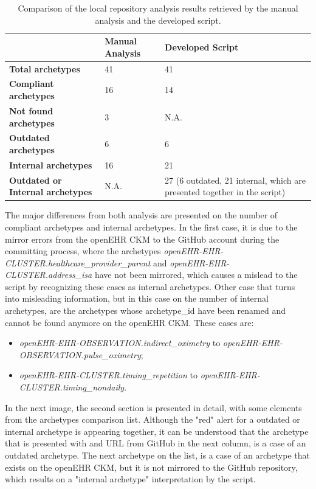 \documentclass[mim_thesis.tex]{subfiles}
\begin{document}
\begin{table}[H]
\centering
\caption{Comparison of the local repository analysis results retrieved by the manual analysis and the developed script. }
\label{tab:comp_manual_script}
\begin{tabular}{p{6cm} p{3cm} p{6.5cm}}
\toprule[2pt]
\textbf{ } & \textbf{Manual Analysis} & \textbf{Developed Script} \\ \midrule[2pt]
\textbf{Total archetypes}  & 41 & 41 \\ \midrule
\textbf{Compliant archetypes} & 16 & 14 \\ \midrule
\textbf{Not found archetypes} & 3 & N.A. \\ \midrule
\textbf{Outdated archetypes} & 6 & 6 \\ \midrule
\textbf{Internal archetypes} & 16 & 21 \\ \midrule
\textbf{Outdated or Internal archetypes} & N.A. & 27 (6 outdated, 21 internal, which are presented together in the script)
\\ \bottomrule[2pt]
\end{tabular}
\end{table}

The major differences from both analysis are presented on the number of compliant archetypes and internal archetypes. In the first case, it is due to the mirror errors from the openEHR CKM to the GitHub account during the committing process, where the archetypes \textit{openEHR-EHR-CLUSTER.healthcare\_provider\_parent} and \textit{openEHR-EHR-CLUSTER.address\_isa} have not been mirrored, which causes a mislead to the script by recognizing these cases as internal archetypes. Other case that turns into misleading information, but in this case on the number of internal archetypes, are the archetypes whose archetype\_id have been renamed and cannot be found anymore on the openEHR CKM. These cases are:

\begin{itemize}
\item \textit{openEHR-EHR-OBSERVATION.indirect\_oximetry} to \textit{openEHR-EHR-OBSERVATION.pulse\_oximetry};
\item \textit{openEHR-EHR-CLUSTER.timing\_repetition} to \textit{openEHR-EHR-CLUSTER.timing\_nondaily}.
\end{itemize}

In the next image, the second section is presented in detail, with some elements from the archetypes comparison list. Although the "red" alert for a outdated or internal archetype is appearing together, it can be understood that the archetype that is presented with and URL from GitHub in the next column, is a case of an outdated archetype. The next archetype on the list, is a case of an archetype that exists on the openEHR CKM, but it is not mirrored to the GitHub repository, which results on a "internal archetype" interpretation by the script.
\end{document}
